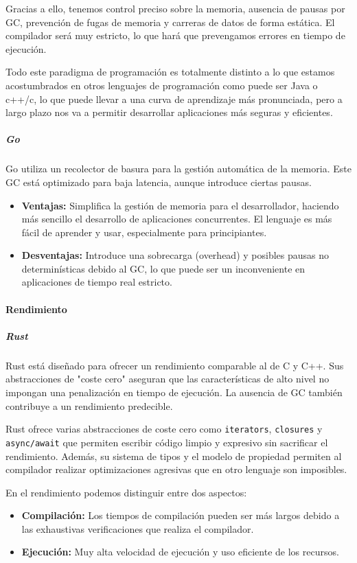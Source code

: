 Gracias a ello, tenemos control preciso sobre la memoria, ausencia de pausas por GC, prevención de fugas de memoria y carreras de datos de forma estática. El compilador será muy estricto, lo que hará que prevengamos errores en tiempo de ejecución.

Todo este paradigma de programación es totalmente distinto a lo que estamos acostumbrados en otros lenguajes de programación como puede ser Java o c++/c, lo que puede llevar a una curva de aprendizaje más pronunciada, pero a largo plazo nos va a permitir desarrollar aplicaciones más seguras y eficientes.

\subparagraph{Go}
Go utiliza un recolector de basura para la gestión automática de la memoria. Este GC está optimizado para baja latencia, aunque introduce ciertas pausas.
\begin{itemize}
    \item \textbf{Ventajas:} Simplifica la gestión de memoria para el desarrollador, haciendo más sencillo el desarrollo de aplicaciones concurrentes. El lenguaje es más fácil de aprender y usar, especialmente para principiantes.
    \item \textbf{Desventajas:} Introduce una sobrecarga (overhead) y posibles pausas no determinísticas debido al GC, lo que puede ser un inconveniente en aplicaciones de tiempo real estricto.
\end{itemize}

\paragraph{Rendimiento}
\subparagraph{Rust}
Rust está diseñado para ofrecer un rendimiento comparable al de C y C++. Sus abstracciones de "coste cero" aseguran que las características de alto nivel no impongan una penalización en tiempo de ejecución. La ausencia de GC también contribuye a un rendimiento predecible.

Rust ofrece varias abstracciones de coste cero como \texttt{iterators}, \texttt{closures} y \texttt{async/await} que permiten escribir código limpio y expresivo sin sacrificar el rendimiento. Además, su sistema de tipos y el modelo de propiedad permiten al compilador realizar optimizaciones agresivas que en otro lenguaje son imposibles.

En el rendimiento podemos distinguir entre dos aspectos:
\begin{itemize}
    \item \textbf{Compilación:} Los tiempos de compilación pueden ser más largos debido a las exhaustivas verificaciones que realiza el compilador.
    \item \textbf{Ejecución:} Muy alta velocidad de ejecución y uso eficiente de los recursos.
\end{itemize}

